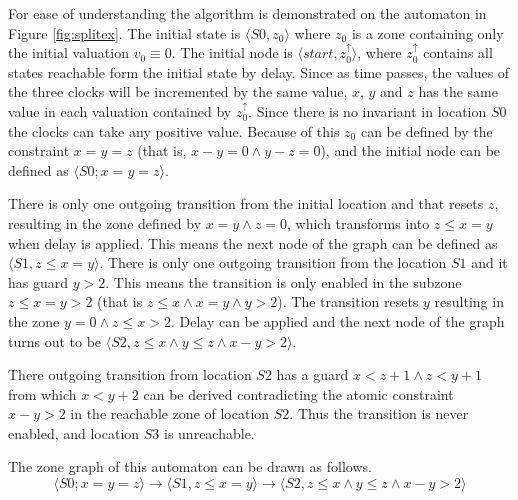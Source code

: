 \begin{example}


For ease of understanding the algorithm is demonstrated on the automaton in Figure \ref{fig:splitex}. The initial state is  $\langle S0, z_0 \rangle$ where $z_0$ is a zone containing only the initial valuation $v_0 \equiv 0$. The initial node is  $\langle start, z_0^\uparrow  \rangle$, where $z_0^\uparrow$ contains all states reachable form the initial state by delay. Since as time passes, the values of the three clocks will be incremented by the same value, $x$, $y$ and $z$ has the same value in each valuation contained by $z_0^\uparrow$. Since there is no invariant in location $S0$ the clocks can take any positive value. Because of this $z_0$ can be defined by the constraint $x=y=z$ (that is, $x-y = 0 \wedge y-z=0 $), and the initial node can be defined as $\langle S0; x=y=z  \rangle$.

There is only one outgoing transition from the initial location and that resets $z$, resulting in the zone defined by $x=y \wedge z=0$, which transforms into $z \leq x=y$ when delay is applied. This means the next node of the graph can be defined as $\langle S1, z \leq x=y \rangle$. There is only one outgoing transition from the location $S1$ and it has guard $y>2$. This means the transition is only enabled in the subzone $z \leq x=y>2$ (that is $z \leq x \wedge x=y \wedge y>2$). The transition resets $y$ resulting in the zone $y=0 \wedge z \leq x > 2$. Delay can be applied and the next node of the graph turns out to be $\langle S2, z \leq x \wedge y \leq z \wedge x-y>2 \rangle$.

There outgoing transition from location $S2$ has a guard $x<z+1 \wedge z<y+1$ from which $x<y+2$ can be derived contradicting the atomic constraint $x-y>2$ in the reachable zone of location $S2$. Thus the transition is never enabled, and location $S3$ is unreachable.

The zone graph of this automaton can be drawn as follows.\[\langle S0; x=y=z  \rangle \to \langle S1, z \leq x=y \rangle \to \langle S2, z \leq x \wedge y \leq z \wedge x-y>2 \rangle \]

\end{example}

